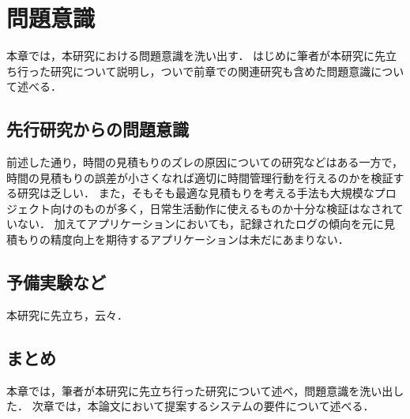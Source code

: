 \chapter{問題意識}
本章では，本研究における問題意識を洗い出す．
はじめに筆者が本研究に先立ち行った研究について説明し，ついで前章での関連研究も含めた問題意識について述べる．

\section{先行研究からの問題意識}
前述した通り，時間の見積もりのズレの原因についての研究などはある一方で，時間の見積もりの誤差が小さくなれば適切に時間管理行動を行えるのかを検証する研究は乏しい．
また，そもそも最適な見積もりを考える手法も大規模なプロジェクト向けのものが多く，日常生活動作に使えるものか十分な検証はなされていない．
加えてアプリケーションにおいても，記録されたログの傾向を元に見積もりの精度向上を期待するアプリケーションは未だにあまりない．

\section{予備実験など}
本研究に先立ち，云々．

\section{まとめ}
本章では，筆者が本研究に先立ち行った研究について述べ，問題意識を洗い出した．
次章では，本論文において提案するシステムの要件について述べる．